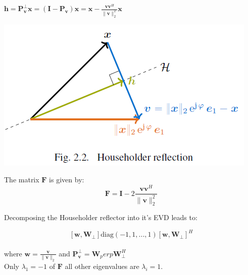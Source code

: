 \documentclass[english]{latex4ei/latex4ei_sheet}
\begin{document}
\begin{sectionbox}
    $\mathbf{h} = \mathbf{P}^\perp_\mathbf{v}\mathbf{x} = (\mathbf{I} - \mathbf{P}_\mathbf{v})\mathbf{x} = \mathbf{x} - \frac{\mathbf{v}\mathbf{v}^H}{\parallel\mathbf{v}\parallel_2^2} \mathbf{x}$

    \includegraphics[width=\textwidth]{img/householder.png}

    The matrix $\mathbf{F}$ is given by:
    $$\mathbf{F} = \mathbf{I} - 2\frac{\mathbf{v}\mathbf{v}^H}{\parallel\mathbf{v}\parallel_2^2}$$

    Decomposing the Householder reflector into it's EVD leads to:

    $$[\mathbf{w}, \mathbf{W}_\perp]\text{diag}(-1,1,...,1)[\mathbf{w},\mathbf{W}_\perp]^H$$\\

    where $\mathbf{w} = \frac{\mathbf{v}}{\parallel \mathbf{v}\parallel_2}$ and $\mathbf{P}_\mathbf{v}^\perp = \mathbf{W}_perp\mathbf{W}_\perp^H$\\
    Only $\lambda_1=-1$ of $\mathbf{F}$ all other eigenvalues are $\lambda_i=1$.
\end{sectionbox}
\end{document}
